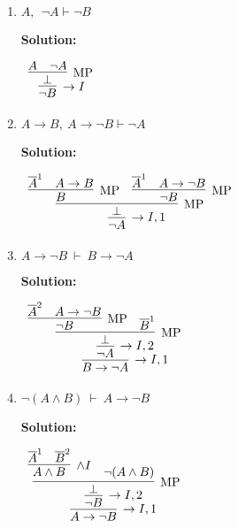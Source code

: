 \documentclass[11pt]{report}
\newcommand{\temp}[2]{{\overline{#2}}^{#1}}
\begin{document}
\begin{enumerate}
\begin{enumerate}
		\item $ A,\ \ \neg  A\vdash  \neg  B$
		
		\textbf{Solution:}

		\begin{center}
			$\begin{array}{c}
				\infer[\to I]{\lnot B}
					{\infer[\MP]{\bot}
						{A & \lnot A}}
			\end{array}$
		\end{center}

		\item $ A\rightarrow B, \  A\rightarrow \lnot B \vdash \lnot  A$
		
		\textbf{Solution:}

		\begin{center}
			$\begin{array}{c}
				\infer[\to I, 1]{\lnot A}
					{\infer[\MP]{\bot}
						{\infer[\MP]{B}
							{\temp{1}{A}
							&
							A \to B}
						&
						\infer[\MP]{\lnot B}
							{\temp{1}{A}
							&
							A \to \lnot B}}}
			\end{array}$
		\end{center}

		\newpage
		\item $A \to \lnot B \ \vdash \ B \to \lnot A$
		
		\textbf{Solution:}

		\begin{center}
			$\begin{array}{c}
				\infer[\to I, 1]{B \to \lnot A}
					{\infer[\to I, 2]{\lnot A}
						{\infer[\MP]{\bot}
							{\infer[\MP]{\lnot B}
								{\temp{2}{A}
								&
								A \to \lnot B}
							&
							\temp{1}{B}}}}
			\end{array}$
		\end{center}

		\item $\lnot (A \land B) \ \vdash \ A \to \lnot B$
		
		\textbf{Solution:}

		\begin{center}
			$\begin{array}{c}
				\infer[\to I, 1]{A \to \lnot B}
					{\infer[\to I, 2]{\lnot B}
						{\infer[\MP]{\bot}
							{\infer[\land I]{A \land B}
								{\temp{1}{A}
								&
								\temp{2}{B}}
							&
							\lnot (A \land B)}}}
			\end{array}$
		\end{center}


\end{enumerate}
\end{enumerate}
\end{document}
